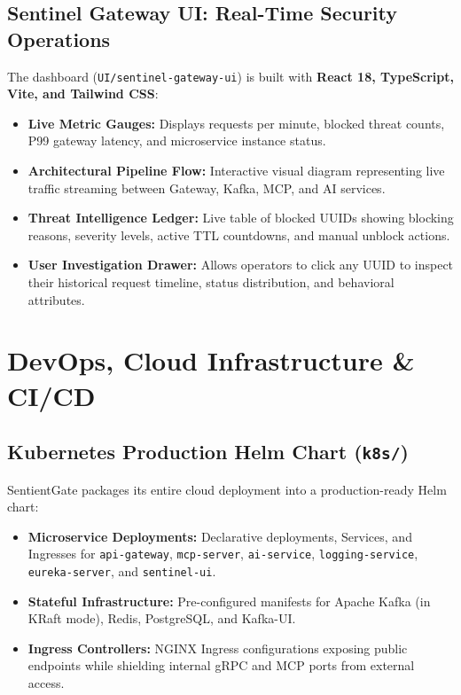 \documentclass[12pt, a4paper]{article}
\newcommand{\service}[1]{\texttt{\color{accentteal}#1}}
\begin{document}
\subsection{Sentinel Gateway UI: Real-Time Security Operations}

The dashboard (\texttt{UI/sentinel-gateway-ui}) is built with \textbf{React 18, TypeScript, Vite, and Tailwind CSS}:
\begin{itemize}[leftmargin=*, itemsep=4pt]
    \item \textbf{Live Metric Gauges:} Displays requests per minute, blocked threat counts, P99 gateway latency, and microservice instance status.
    \item \textbf{Architectural Pipeline Flow:} Interactive visual diagram representing live traffic streaming between Gateway, Kafka, MCP, and AI services.
    \item \textbf{Threat Intelligence Ledger:} Live table of blocked UUIDs showing blocking reasons, severity levels, active TTL countdowns, and manual unblock actions.
    \item \textbf{User Investigation Drawer:} Allows operators to click any UUID to inspect their historical request timeline, status distribution, and behavioral attributes.
\end{itemize}

\newpage
\section{DevOps, Cloud Infrastructure \& CI/CD}

\subsection{Kubernetes Production Helm Chart (\texttt{k8s/})}

SentientGate packages its entire cloud deployment into a production-ready Helm chart:
\begin{itemize}[leftmargin=*, itemsep=4pt]
    \item \textbf{Microservice Deployments:} Declarative deployments, Services, and Ingresses for \service{api-gateway}, \service{mcp-server}, \service{ai-service}, \service{logging-service}, \service{eureka-server}, and \service{sentinel-ui}.
    \item \textbf{Stateful Infrastructure:} Pre-configured manifests for Apache Kafka (in KRaft mode), Redis, PostgreSQL, and Kafka-UI.
    \item \textbf{Ingress Controllers:} NGINX Ingress configurations exposing public endpoints while shielding internal gRPC and MCP ports from external access.
\end{itemize}
\end{document}
